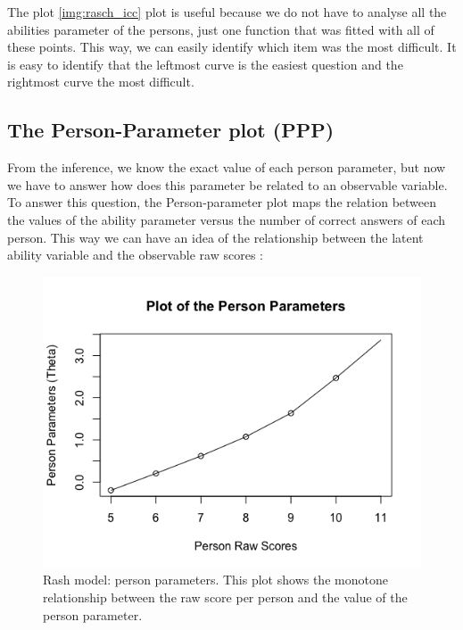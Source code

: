 The plot \cref{img:rasch_icc} plot is useful because we do not have to analyse all the abilities parameter of the persons, just one function that was fitted with all of these points. This way, we can easily identify which item was the most difficult. It is easy to identify that the leftmost curve is the easiest question and the rightmost curve the most difficult. 

\newpage

\subsection{The Person-Parameter plot (PPP)}
From the inference, we know the exact value of each person parameter, but now we have to answer how does this parameter be related to an observable variable. To answer this question, the Person-parameter plot maps the relation between the values of the ability parameter versus the number of correct answers of each person. This way we can have an idea of the relationship between the latent ability variable and the observable raw scores \cite{bond2015applying}:

\begin{figure}[ht!]
  \centering
  \includegraphics[width=.75\linewidth]{img/rasch_person.png}
  \caption{Rash model: person parameters. This plot shows the monotone relationship between the raw score per person and the value of the person parameter.}
  \label{img:rasch_person}
\end{figure}


